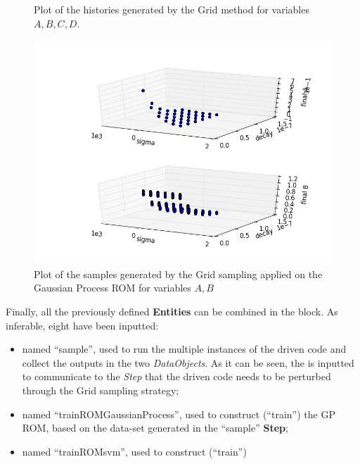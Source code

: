 \begin{enumerate}
\begin{figure}[h!]
  \caption{Plot of the histories generated by the Grid method for variables $A,B,C,D$.}
  \label{fig:ROMgrid_histories}
 \end{figure}
 \begin{figure}[h!]
  \centering
  \includegraphics[scale=0.7]{../../tests/framework/user_guide/ReducedOrderModeling/gold/ROMConstruction/1-samplesPlot3DROMgp_scatter-scatter.png}
  \caption{Plot of the samples generated by the Grid sampling applied on the Gaussian Process ROM for variables $A,B$}
  \label{fig:ROMgp_samples}
 \end{figure}
   Finally, all the previously defined \textbf{Entities} can be combined in
   the  block. As inferable,
   eight  have been inputted:
   \begin{itemize}
     \item {} named ``sample'', used to run the multiple
     instances of the driven code and
     collect the outputs in the two \textit{DataObjects}. As it can be
     seen, the  is inputted to communicate to the
     \textit{Step} that the driven code needs to
     be perturbed through the Grid sampling strategy;
     \item {} named ``trainROMGaussianProcess'', used to construct (``train'')
     the GP ROM, based on the data-set generated in the  ``sample'' \textbf{Step};
     \item {} named ``trainROMsvm'', used to construct (``train'')

\end{itemize}
\end{enumerate}
